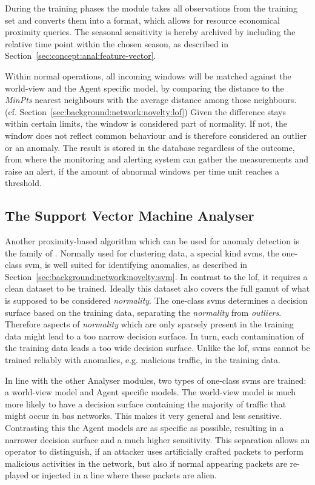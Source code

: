 During the training phases the module takes all observations from the training set and converts them into a format, which allows for resource economical proximity queries. The seasonal sensitivity is hereby archived by including the relative time point within the chosen season, as described in Section~\ref{sec:concept:anal:feature-vector}.

Within normal operations, all incoming windows will be matched against the world-view and the Agent specific model, by comparing the distance to the \emph{MinPts} nearest neighbours with the average distance among those neighbours. (cf. Section~\ref{sec:background:network:novelty:lof})
Given the difference stays within certain limits, the window is considered part of normality. If not, the window does not reflect common behaviour and is therefore considered an outlier or an anomaly.
The result is stored in the database regardless of the outcome, from where the monitoring and alerting system can gather the measurements and raise an alert, if the amount of abnormal windows per time unit reaches a threshold.

\subsection{The Support Vector Machine Analyser}
\label{sec:concept:anal:svm}

Another proximity-based algorithm which can be used for anomaly detection is the family of . Normally used for clustering data, a special kind \glspl{svm}, the one-class \gls{svm}, is well suited for identifying anomalies, as described in Section~\ref{sec:background:network:novelty:svm}.
In contrast to the \gls{lof}, it requires a clean dataset to be trained. Ideally this dataset also covers the full gamut of what is supposed to be considered \emph{normality}.
The one-class \glspl{svm} determines a decision surface based on the training data, separating the \emph{normality} from \emph{outliers}.
Therefore aspects of \emph{normality} which are only sparsely present in the training data might lead to a too narrow decision surface.
In turn, each contamination of the training data leads a too wide decision surface.
Unlike the \gls{lof}, \glspl{svm} cannot be trained reliably with anomalies, e.g. malicious traffic, in the training data.

In line with the other Analyser modules, two types of one-class \glspl{svm} are trained: a world-view model and Agent specific models.
The world-view model is much more likely to have a decision surface containing the majority of traffic that might occur in \gls{bas} networks.
This makes it very general and less sensitive.
Contrasting this the Agent models are as specific as possible, resulting in a narrower decision surface and a much higher sensitivity.
This separation allows an operator to distinguish, if an attacker uses artificially crafted packets to perform malicious activities in the network, but also if normal appearing packets are re-played or injected in a line where these packets are alien.

